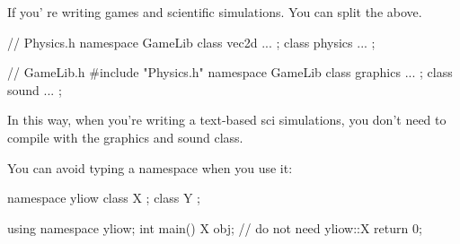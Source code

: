 If you' re writing games and scientific simulations. You
can split the above.

\begin{console}
// Physics.h
namespace GameLib
{    
     class vec2d { ... };
     class physics { ... };
} 
\end{console}

\begin{console}
// GameLib.h
#include "Physics.h"
namespace GameLib
{    
     class graphics { ... };
     class sound { ... };
} 
\end{console}

In this way, when you're writing a text-based sci simulations, you don't need to compile with the graphics and sound class.

\newpage{}

You can avoid typing a namespace when you use it:

\begin{console} 
namespace yliow
{    
     class X {};
     class Y {};
}

using namespace yliow;
int main()
{    
     X obj; // do not need yliow::X
     return 0;
}
\end{console}
        
